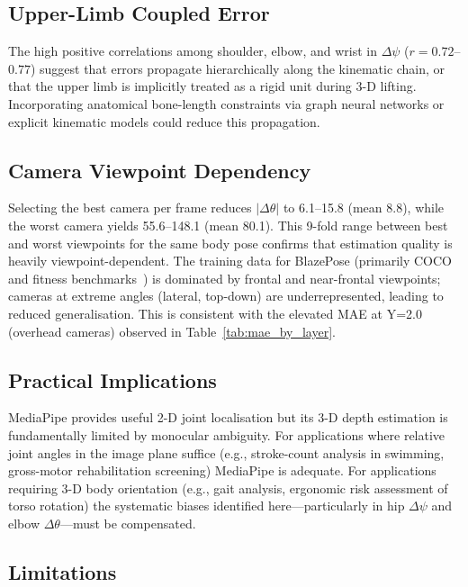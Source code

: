 \documentclass[twocolumn]{article}
\begin{document}
\subsection{Upper-Limb Coupled Error}

The high positive correlations among shoulder, elbow, and wrist in
$\Delta\psi$ ($r=0.72$--$0.77$) suggest that errors propagate
hierarchically along the kinematic chain, or that the upper limb is
implicitly treated as a rigid unit during 3-D lifting. Incorporating
anatomical bone-length constraints via graph neural networks or explicit
kinematic models could reduce this propagation.

\subsection{Camera Viewpoint Dependency}

Selecting the best camera per frame reduces $|\Delta\theta|$ to 6.1\degree{}--15.8\degree{}
(mean 8.8\degree{}), while the worst camera yields 55.6\degree{}--148.1\degree{} (mean 80.1\degree{}).
This 9-fold range between best and worst viewpoints for the same body pose
confirms that estimation quality is heavily viewpoint-dependent.
The training data for BlazePose (primarily COCO~\cite{coco} and fitness
benchmarks~\cite{blazepose}) is dominated by frontal and near-frontal viewpoints;
cameras at extreme angles (lateral, top-down) are underrepresented, leading
to reduced generalisation. This is consistent with the elevated MAE at
Y=2.0 (overhead cameras) observed in Table~\ref{tab:mae_by_layer}.

\subsection{Practical Implications}

MediaPipe provides useful 2-D joint localisation but its 3-D depth
estimation is fundamentally limited by monocular ambiguity.
For applications where relative joint angles in the image plane suffice
(e.g., stroke-count analysis in swimming, gross-motor rehabilitation
screening) MediaPipe is adequate. For applications requiring 3-D body
orientation (e.g., gait analysis, ergonomic risk assessment of torso
rotation) the systematic biases identified here---particularly in hip
$\Delta\psi$ and elbow $\Delta\theta$---must be compensated.

\subsection{Limitations}
\end{document}
